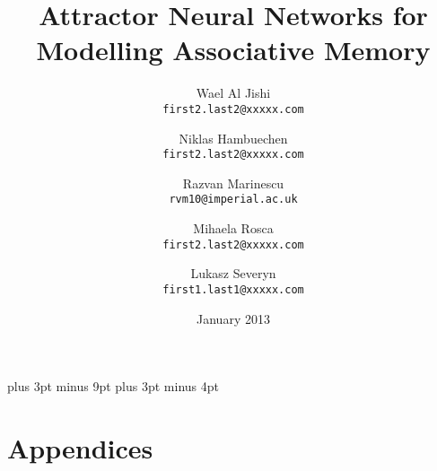 \documentclass[11pt,a4paper,oneside]{report}
\title{Attractor Neural Networks for Modelling Associative Memory}
\date{January 2013}
\author{
  Wael Al Jishi\\
  \texttt{first2.last2@xxxxx.com}
  \and
  Niklas Hambuechen\\
  \texttt{first2.last2@xxxxx.com}
  \and
  Razvan Marinescu\\
  \texttt{rvm10@imperial.ac.uk}
  \and
  Mihaela Rosca\\
  \texttt{first2.last2@xxxxx.com}
  \and
  Lukasz Severyn\\
  \texttt{first1.last1@xxxxx.com}
}
\begin{document}
\belowdisplayskip=12pt plus 3pt minus 9pt
\belowdisplayshortskip=7pt plus 3pt minus 4pt







\maketitle{}


\renewcommand{\abstractname}{Executive Summary}



\tableofcontents















\nocite{*} %





\chapter{Appendices}

\end{document}
